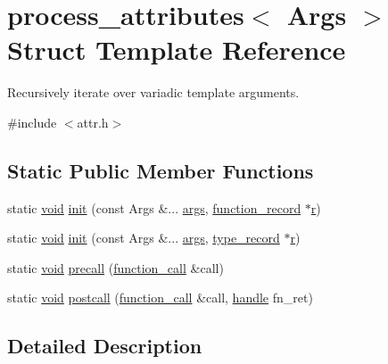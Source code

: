 \hypertarget{structprocess__attributes}{}\section{process\+\_\+attributes$<$ Args $>$ Struct Template Reference}
\label{structprocess__attributes}


Recursively iterate over variadic template arguments.  




{\ttfamily \#include $<$attr.\+h$>$}

\subsection*{Static Public Member Functions}
\begin{DoxyCompactItemize}
\item 
static \mbox{\hyperlink{_s_d_l__opengles2__gl2ext_8h_ae5d8fa23ad07c48bb609509eae494c95}{void}} \mbox{\hyperlink{structprocess__attributes_a27a45881631e93c2f3a126f8bd661a77}{init}} (const Args \&... \mbox{\hyperlink{classargs}{args}}, \mbox{\hyperlink{structfunction__record}{function\+\_\+record}} $\ast$\mbox{\hyperlink{_s_d_l__opengl_8h_a42ce7cdc612e53abee15043f80220d97}{r}})
\item 
static \mbox{\hyperlink{_s_d_l__opengles2__gl2ext_8h_ae5d8fa23ad07c48bb609509eae494c95}{void}} \mbox{\hyperlink{structprocess__attributes_aaaf6a28124bd149eb824da439e173714}{init}} (const Args \&... \mbox{\hyperlink{classargs}{args}}, \mbox{\hyperlink{structtype__record}{type\+\_\+record}} $\ast$\mbox{\hyperlink{_s_d_l__opengl_8h_a42ce7cdc612e53abee15043f80220d97}{r}})
\item 
static \mbox{\hyperlink{_s_d_l__opengles2__gl2ext_8h_ae5d8fa23ad07c48bb609509eae494c95}{void}} \mbox{\hyperlink{structprocess__attributes_a2b4b705a56f8d0e65fa269837f8cd148}{precall}} (\mbox{\hyperlink{structfunction__call}{function\+\_\+call}} \&call)
\item 
static \mbox{\hyperlink{_s_d_l__opengles2__gl2ext_8h_ae5d8fa23ad07c48bb609509eae494c95}{void}} \mbox{\hyperlink{structprocess__attributes_add46fd700add3f95c2175d9da79ceb86}{postcall}} (\mbox{\hyperlink{structfunction__call}{function\+\_\+call}} \&call, \mbox{\hyperlink{classhandle}{handle}} fn\+\_\+ret)
\end{DoxyCompactItemize}


\subsection{Detailed Description}
